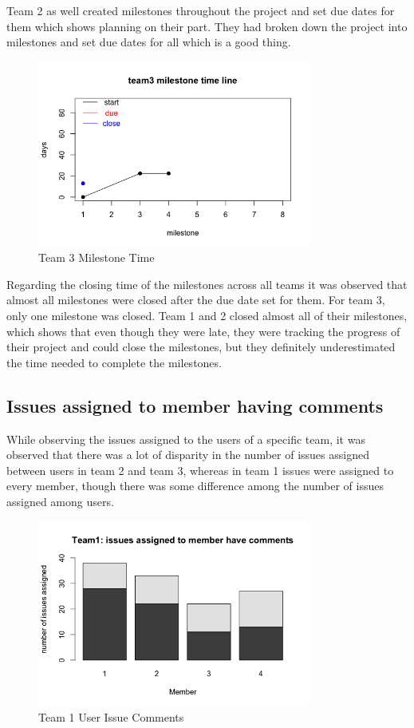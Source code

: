 \documentclass[conference]{IEEEtran}
\begin{document}
Team 2 as well created milestones throughout the project and set due dates for them which shows planning on their part. They had broken down the project into milestones and set due dates for all which is a good thing.

\begin{figure}[H]
    \centering
    \includegraphics[width=9cm]{../AprilProject/pic/team3_milestone_time.png}
    \caption{Team 3 Milestone Time}
    \label{team3_milestone_time}
\end{figure}

Regarding the closing time of the milestones across all teams it was observed that almost all milestones were closed after the due date set for them. For team 3, only one milestone was closed. Team 1 and 2 closed almost all of their milestones, which shows that even though they were late, they were tracking the progress of their project and could close the milestones, but they definitely underestimated the time needed to complete the milestones.

\subsection{Issues assigned to member having comments}
While observing the issues assigned to the users of a specific team, it was observed that there was a lot of disparity in the number of issues assigned between users in team 2 and team 3, whereas in team 1 issues were assigned to every member, though there was some difference among the number of issues assigned among users.

\begin{figure}[H]
    \centering
    \includegraphics[width=9cm]{../AprilProject/pic/team1_user_issue_comments.png}
    \caption{Team 1 User Issue Comments}
    \label{team1_issue_comment}
\end{figure}
\end{document}
